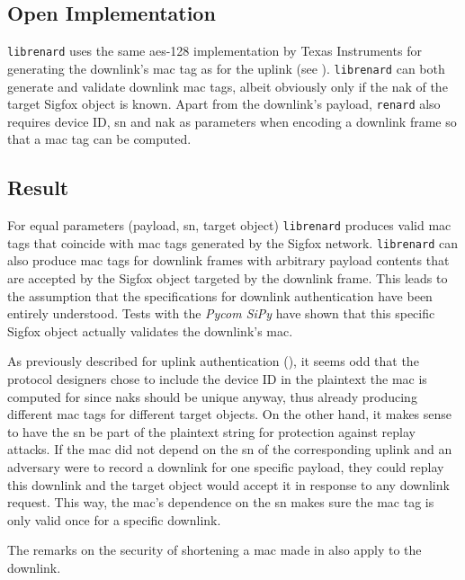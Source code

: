 \subsection{Open Implementation}
\texttt{librenard} uses the same \gls{aes}-128 implementation by Texas Instruments \cite{tiaes} for generating the downlink's \gls{mac} tag as for the uplink (see ).
\texttt{librenard} can both generate and validate downlink \gls{mac} tags, albeit obviously only if the \gls{nak} of the target Sigfox object is known.
Apart from the downlink's payload, \texttt{renard} also requires device ID, \gls{sn} and \gls{nak} as parameters when encoding a downlink frame so that a \gls{mac} tag can be computed.

\subsection{Result}
For equal parameters (payload, \gls{sn}, target object) \texttt{librenard} produces valid \gls{mac} tags that coincide with \gls{mac} tags generated by the Sigfox network.
\texttt{librenard} can also produce \gls{mac} tags for downlink frames with arbitrary payload contents that are accepted by the Sigfox object targeted by the downlink frame.
This leads to the assumption that the specifications for downlink authentication have been entirely understood.
Tests with the \textit{Pycom SiPy} have shown that this specific Sigfox object actually validates the downlink's \gls{mac}.

As previously described for uplink authentication (), it seems odd that the protocol designers chose to include the device ID in the plaintext the \gls{mac} is computed for since \glspl{nak} should be unique anyway, thus already producing different \gls{mac} tags for different target objects.
On the other hand, it makes sense to have the \gls{sn} be part of the plaintext string for protection against replay attacks.
If the \gls{mac} did not depend on the \gls{sn} of the corresponding uplink and an adversary were to record a downlink for one specific payload, they could replay this downlink and the target object would accept it in response to any downlink request.
This way, the \gls{mac}'s dependence on the \gls{sn} makes sure the \gls{mac} tag is only valid once for a specific downlink.

The remarks on the security of shortening a \gls{mac} made in  also apply to the downlink.

\FloatBarrier
